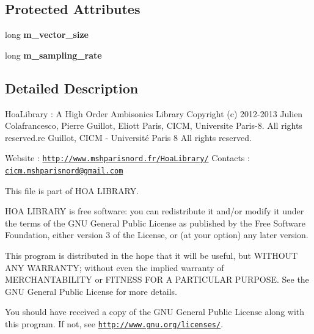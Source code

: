 \subsection*{Protected Attributes}
\begin{DoxyCompactItemize}
\item 
\hypertarget{class_filter_af9ca666c9fe182e676238dac04429954}{long {\bfseries m\-\_\-vector\-\_\-size}}\label{class_filter_af9ca666c9fe182e676238dac04429954}

\item 
\hypertarget{class_filter_a320edddf1bc2586ac19c9f5cd833bd82}{long {\bfseries m\-\_\-sampling\-\_\-rate}}\label{class_filter_a320edddf1bc2586ac19c9f5cd833bd82}

\end{DoxyCompactItemize}


\subsection{Detailed Description}
Hoa\-Library \-: A High Order Ambisonics Library Copyright (c) 2012-\/2013 Julien Colafrancesco, Pierre Guillot, Eliott Paris, C\-I\-C\-M, Universite Paris-\/8. All rights reserved.\-re Guillot, C\-I\-C\-M -\/ Université Paris 8 All rights reserved.

Website \-: \href{http://www.mshparisnord.fr/HoaLibrary/}{\tt http\-://www.\-mshparisnord.\-fr/\-Hoa\-Library/} Contacts \-: \href{mailto:cicm.mshparisnord@gmail.com}{\tt cicm.\-mshparisnord@gmail.\-com}

This file is part of H\-O\-A L\-I\-B\-R\-A\-R\-Y.

H\-O\-A L\-I\-B\-R\-A\-R\-Y is free software\-: you can redistribute it and/or modify it under the terms of the G\-N\-U General Public License as published by the Free Software Foundation, either version 3 of the License, or (at your option) any later version.

This program is distributed in the hope that it will be useful, but W\-I\-T\-H\-O\-U\-T A\-N\-Y W\-A\-R\-R\-A\-N\-T\-Y; without even the implied warranty of M\-E\-R\-C\-H\-A\-N\-T\-A\-B\-I\-L\-I\-T\-Y or F\-I\-T\-N\-E\-S\-S F\-O\-R A P\-A\-R\-T\-I\-C\-U\-L\-A\-R P\-U\-R\-P\-O\-S\-E. See the G\-N\-U General Public License for more details.

You should have received a copy of the G\-N\-U General Public License along with this program. If not, see \href{http://www.gnu.org/licenses/}{\tt http\-://www.\-gnu.\-org/licenses/}. 


